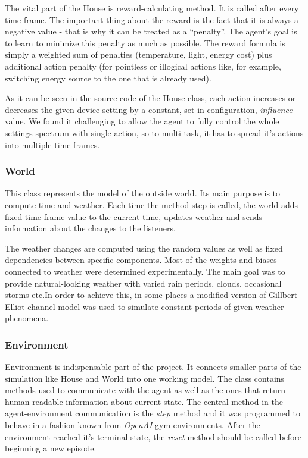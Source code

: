 \documentclass{article}
\begin{document}
The vital part of the House is reward-calculating method. It is called after every time-frame. The important thing about the reward is the fact that it is always a negative value - that is why it can be treated as a “penalty”. The agent’s goal is to learn to minimize this penalty as much as possible. The reward formula is simply a weighted sum of penalties (temperature, light, energy cost) plus additional action penalty (for pointless or illogical actions like, for example, switching energy source to the one that is already used). 

As it can be seen in the source code of the House class, each action increases or decreases the given device setting by a constant, set in configuration, \textit{influence} value. We found it challenging to allow the agent to fully control the whole settings spectrum with single action, so to multi-task, it has to spread it's actions into multiple time-frames.

\subsubsection{World}
This class represents the model of the outside world. Its main purpose is to compute time and weather. Each time the method step is called, the world adds fixed time-frame value to the current time, updates weather and sends information about the changes to the listeners.

The weather changes are computed using the random values as well as fixed dependencies between specific components. Most of the weights and biases connected to weather were determined experimentally. The main goal was to provide natural-looking weather with varied rain periods, clouds, occasional storms etc.In order to achieve this, in some places a modified version of Gillbert-Elliot channel model was used to simulate constant periods of given weather phenomena.

\subsubsection{Environment}
Environment is indispensable part of the project. It connects smaller parts of the simulation like House and World into one working model. The class contains methods used to communicate with the agent as well as the ones that return human-readable information about current state. The central method in the agent-environment communication is the \textit{step} method and it was programmed to behave in a fashion known from \textit{OpenAI} gym environments. After the environment reached it's terminal state, the \textit{reset} method should be called before beginning a new episode. 
\end{document}
